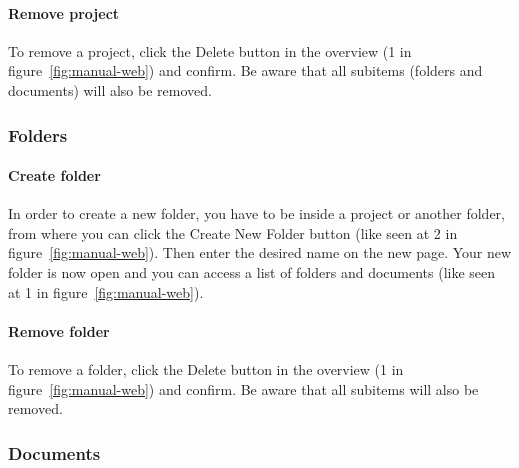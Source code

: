 	\paragraph{Remove project}
	To remove a project, click the Delete button in the overview (1 in figure~\ref{fig:manual-web}) and confirm. Be aware that all subitems (folders and documents) will also be removed.

\subsubsection{Folders}

	\paragraph{Create folder}
	In order to create a new folder, you have to be inside a project or another folder, from where you can click the Create New Folder button (like seen at 2 in figure~\ref{fig:manual-web}). Then enter the desired name on the new page. Your new folder is now open and you can access a list of folders and documents (like seen at 1 in figure~\ref{fig:manual-web}).

	\paragraph{Remove folder}
	To remove a folder, click the Delete button in the overview (1 in figure~\ref{fig:manual-web}) and confirm. Be aware that all subitems will also be removed.

\subsubsection{Documents}
	
